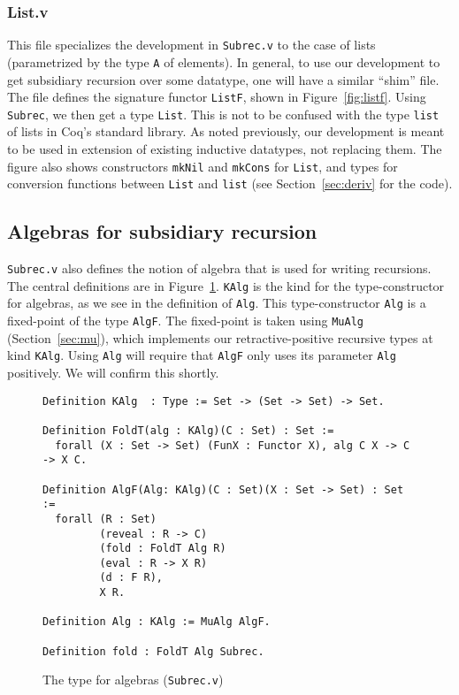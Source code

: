\documentclass[a4paper,USenglish]{lipics-v2021}
\begin{document}
  \subsubsection{List.v}

  This file specializes the development in \verb|Subrec.v| to the case
  of lists (parametrized by the type \verb|A| of elements).  In
  general, to use our development to get subsidiary recursion over
  some datatype, one will have a similar ``shim'' file.  The file
  defines the signature functor \verb|ListF|, shown in
  Figure~\ref{fig:listf}.  Using \verb|Subrec|, we then get a type
  \verb|List|.  This is not to be confused with the type \verb|list|
  of lists in Coq's standard library.  As noted previously, our
  development is meant to be used in extension of existing inductive
  datatypes, not replacing them.  The figure also shows constructors
  \verb|mkNil| and \verb|mkCons| for \verb|List|, and types for
  conversion functions between \verb|List| and \verb|list| (see
  Section~\ref{sec:deriv} for the code).
  

\subsection{Algebras for subsidiary recursion}

\verb|Subrec.v| also defines the notion of algebra that is used for
writing recursions.  The central definitions are in
Figure~\ref{fig:algf}.  \verb|KAlg| is the kind for the
type-constructor for algebras, as we see in the definition of
\verb|Alg|.  This type-constructor \verb|Alg| is a fixed-point of the
type \verb|AlgF|.  The fixed-point is taken using \verb|MuAlg|
(Section~\ref{sec:mu}), which implements our retractive-positive
recursive types at kind \verb|KAlg|.  Using \verb|Alg| will require
that \verb|AlgF| only uses its parameter \verb|Alg| positively.  We
will confirm this shortly.

\begin{figure}
\begin{verbatim}
Definition KAlg  : Type := Set -> (Set -> Set) -> Set.

Definition FoldT(alg : KAlg)(C : Set) : Set :=
  forall (X : Set -> Set) (FunX : Functor X), alg C X -> C -> X C.

Definition AlgF(Alg: KAlg)(C : Set)(X : Set -> Set) : Set :=
  forall (R : Set)
         (reveal : R -> C)        
         (fold : FoldT Alg R)
         (eval : R -> X R)      
         (d : F R),             
         X R.

Definition Alg : KAlg := MuAlg AlgF.

Definition fold : FoldT Alg Subrec.
\end{verbatim}
\caption{The type for algebras (\texttt{Subrec.v})}
\label{fig:algf}
\end{figure}
\end{document}
